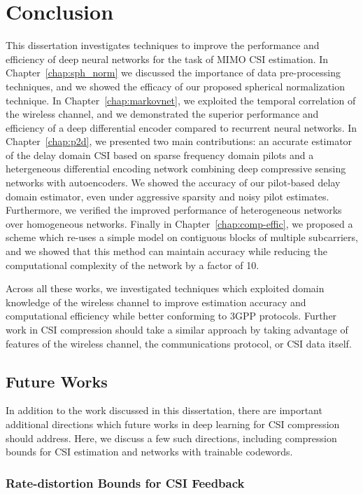 \chapter{Conclusion} \label{chap:conclusion}

This dissertation investigates techniques to improve the performance and efficiency of deep neural networks for the task of MIMO CSI estimation. In Chapter~\ref{chap:sph_norm} we discussed the importance of data pre-processing techniques, and we showed the efficacy of our proposed spherical normalization technique. In Chapter~\ref{chap:markovnet}, we exploited the temporal correlation of the wireless channel, and we demonstrated the superior performance and efficiency of a deep differential encoder compared to recurrent neural networks. In Chapter~\ref{chap:p2d}, we presented two main contributions: an accurate estimator of the delay domain CSI based on sparse frequency domain pilots and a hetergeneous differential encoding network combining deep compressive sensing networks with autoencoders. We showed the accuracy of our pilot-based delay domain estimator, even under aggressive sparsity and noisy pilot estimates. Furthermore, we verified the improved performance of heterogeneous networks over homogeneous networks. Finally in Chapter~\ref{chap:comp-effic}, we proposed a scheme which re-uses a simple model on contiguous blocks of multiple subcarriers, and we showed that this method can maintain accuracy while reducing the computational complexity of the network by a factor of 10.  

Across all these works, we investigated techniques which exploited domain knowledge of the wireless channel to improve estimation accuracy and computational efficiency while better conforming to 3GPP protocols. Further work in CSI compression should take a similar approach by taking advantage of features of the wireless channel, the communications protocol, or CSI data itself.

\section{Future Works}

In addition to the work discussed in this dissertation, there are important additional directions which future works in deep learning for CSI compression should address. Here, we discuss a few such directions, including compression bounds for CSI estimation and networks with trainable codewords.

\subsection{Rate-distortion Bounds for CSI Feedback}


